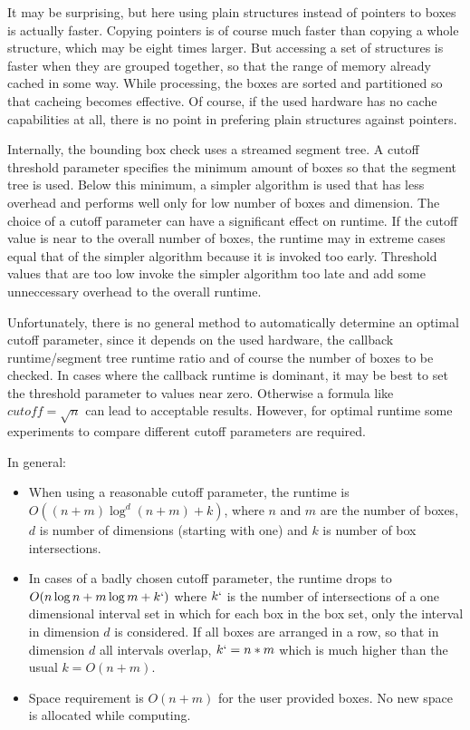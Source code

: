 {It may be surprising, but here using plain structures instead of
pointers to boxes is actually faster. Copying pointers is of course
much faster than copying a whole structure, which may be eight times
larger. But accessing a set of structures is faster when they are
grouped together, so that the range of memory already cached in some
way. While processing, the boxes are sorted and partitioned so that
cacheing becomes effective. Of course, if the used hardware has no
cache capabilities at all, there is no point in prefering plain
structures against pointers.


Internally, the bounding box check uses a streamed segment tree. A
cutoff threshold parameter specifies the minimum amount of boxes so
that the segment tree is used. Below this minimum, a simpler algorithm
is used that has less overhead and performs well only for low number
of boxes and dimension. The choice of a cutoff parameter can have a
significant effect on runtime. If the cutoff value is near to the
overall number of boxes, the runtime may in extreme cases equal that
of the simpler algorithm because it is invoked too early. Threshold
values that are too low invoke the simpler algorithm too late and add
some unneccessary overhead to the overall runtime.

Unfortunately, there is no general method to automatically determine
an optimal cutoff parameter, since it depends on the used hardware,
the callback runtime/segment tree runtime ratio and of course the
number of boxes to be checked. In cases where the callback runtime is
dominant, it may be best to set the threshold parameter to values near
zero. Otherwise a formula like $cutoff=\sqrt{n}$ can lead to
acceptable results. However, for optimal runtime some experiments to
compare different cutoff parameters are required.

In general:

\begin{itemize}
    \item
      When using a reasonable cutoff parameter, the runtime is
      $O((n+m)\log^{d}(n+m)+k)$, where $n$ and $m$ are the number of
      boxes, $d$ is number of dimensions (starting with one) and $k$
      is number of box intersections. 
    \item
      In cases of a badly chosen cutoff parameter, the runtime drops
      to $O(n\log n+m\log m+k`)$ where $k`$ is the number of
      intersections of a one dimensional interval set in which for
      each box in the box set, only the interval in dimension $d$ is
      considered. If all boxes are arranged in a row, so that in
      dimension $d$ all intervals overlap, $k`=n*m$ which is much
      higher than the usual $k=O(n+m)$. 
    \item
      Space requirement is $O(n+m)$ for the user provided boxes. No
      new space is allocated while computing.  
\end{itemize}

}
